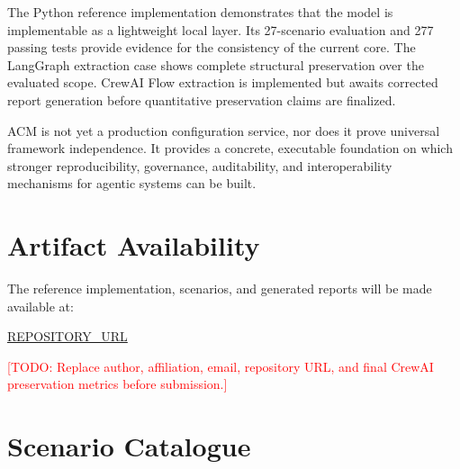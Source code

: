 \documentclass[10pt]{article}
\newcommand{\todo}[1]{\textcolor{red}{[TODO: #1]}}
\begin{document}
The Python reference implementation demonstrates that the model is implementable as a lightweight local layer. Its 27-scenario evaluation and 277 passing tests provide evidence for the consistency of the current core. The LangGraph extraction case shows complete structural preservation over the evaluated scope. CrewAI Flow extraction is implemented but awaits corrected report generation before quantitative preservation claims are finalized.

ACM is not yet a production configuration service, nor does it prove universal framework independence. It provides a concrete, executable foundation on which stronger reproducibility, governance, auditability, and interoperability mechanisms for agentic systems can be built.

\section*{Artifact Availability}

The reference implementation, scenarios, and generated reports will be made available at:

\begin{center}
\url{REPOSITORY_URL}
\end{center}

\todo{Replace author, affiliation, email, repository URL, and final CrewAI preservation metrics before submission.}




\appendix

\section{Scenario Catalogue}
\label{app:scenarios}
\end{document}
